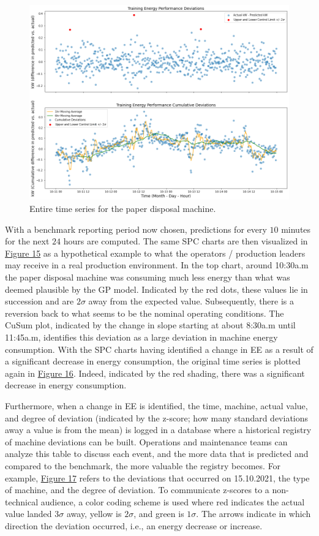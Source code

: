 \begin{figure}[h]
\centering
\graphicspath{ {./images/} }
\includegraphics[scale=0.49]{images/entsorgung_baseline_SPC.png}
\caption{Entire time series for the paper disposal machine.}
\end{figure}

With a benchmark reporting period now chosen, predictions for every $10$ minutes for the next $24$ hours are computed. The same SPC charts are then visualized in \hyperlink{figure.15}{Figure 15} as a hypothetical example to what the operators / production leaders may receive in a real production environment. In the top chart, around 10:30a.m the paper disposal machine was consuming much less energy than what was deemed plausible by the GP model. Indicated by the red dots, these values lie in succession and are $2\sigma$ away from the expected value. Subsequently, there is a reversion back to what seems to be the nominal operating conditions. The CuSum plot, indicated by the change in slope starting at about 8:30a.m until 11:45a.m, identifies this deviation as a large deviation in machine energy consumption. With the SPC charts having identified a change in EE as a result of a significant decrease in energy consumption, the original time series is plotted again in \hyperlink{figure.16}{Figure 16}. Indeed, indicated by the red shading, there was a significant decrease in energy consumption. 

Furthermore, when a change in EE is identified, the time, machine, actual value, and degree of deviation (indicated by the z-score; how many standard deviations away a value is from the mean) is logged in a database where a historical registry of machine deviations can be built. Operations and maintenance teams can analyze this table to discuss each event, and the more data that is predicted and compared to the benchmark, the more valuable the registry becomes. For example, \hyperlink{figure.17}{Figure 17} refers to the deviations that occurred on 15.10.2021, the type of machine, and the degree of deviation. To communicate z-scores to a non-technical audience, a color coding scheme is used where red indicates the actual value landed $3\sigma$ away, yellow is $2\sigma$, and green is $1\sigma$. The arrows indicate in which direction the deviation occurred, i.e., an energy decrease or increase.



